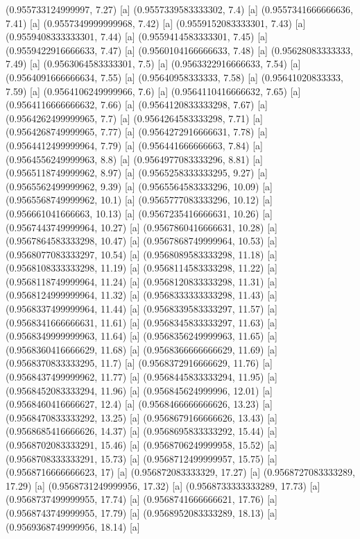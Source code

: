 {{{(0.955733124999997, 7.27) [a] 
(0.9557339583333302, 7.4) [a] 
(0.9557341666666636, 7.41) [a] 
(0.9557349999999968, 7.42) [a] 
(0.9559152083333301, 7.43) [a] 
(0.9559408333333301, 7.44) [a] 
(0.9559414583333301, 7.45) [a] 
(0.9559422916666633, 7.47) [a] 
(0.9560104166666633, 7.48) [a] 
(0.95628083333333, 7.49) [a] 
(0.9563064583333301, 7.5) [a] 
(0.9563322916666633, 7.54) [a] 
(0.9564091666666634, 7.55) [a] 
(0.95640958333333, 7.58) [a] 
(0.95641020833333, 7.59) [a] 
(0.9564106249999966, 7.6) [a] 
(0.9564110416666632, 7.65) [a] 
(0.9564116666666632, 7.66) [a] 
(0.9564120833333298, 7.67) [a] 
(0.9564262499999965, 7.7) [a] 
(0.9564264583333298, 7.71) [a] 
(0.9564268749999965, 7.77) [a] 
(0.9564272916666631, 7.78) [a] 
(0.9564412499999964, 7.79) [a] 
(0.956441666666663, 7.84) [a] 
(0.9564556249999963, 8.8) [a] 
(0.9564977083333296, 8.81) [a] 
(0.9565118749999962, 8.97) [a] 
(0.9565258333333295, 9.27) [a] 
(0.9565562499999962, 9.39) [a] 
(0.9565564583333296, 10.09) [a] 
(0.9565568749999962, 10.1) [a] 
(0.9565777083333296, 10.12) [a] 
(0.956661041666663, 10.13) [a] 
(0.9567235416666631, 10.26) [a] 
(0.9567443749999964, 10.27) [a] 
(0.9567860416666631, 10.28) [a] 
(0.9567864583333298, 10.47) [a] 
(0.9567868749999964, 10.53) [a] 
(0.9568077083333297, 10.54) [a] 
(0.9568089583333298, 11.18) [a] 
(0.9568108333333298, 11.19) [a] 
(0.9568114583333298, 11.22) [a] 
(0.9568118749999964, 11.24) [a] 
(0.9568120833333298, 11.31) [a] 
(0.9568124999999964, 11.32) [a] 
(0.9568333333333298, 11.43) [a] 
(0.9568337499999964, 11.44) [a] 
(0.9568339583333297, 11.57) [a] 
(0.9568341666666631, 11.61) [a] 
(0.9568345833333297, 11.63) [a] 
(0.9568349999999963, 11.64) [a] 
(0.9568356249999963, 11.65) [a] 
(0.9568360416666629, 11.68) [a] 
(0.9568366666666629, 11.69) [a] 
(0.9568370833333295, 11.7) [a] 
(0.9568372916666629, 11.76) [a] 
(0.9568437499999962, 11.77) [a] 
(0.9568445833333294, 11.95) [a] 
(0.9568452083333294, 11.96) [a] 
(0.956845624999996, 12.01) [a] 
(0.9568460416666627, 12.4) [a] 
(0.9568466666666626, 13.23) [a] 
(0.9568470833333292, 13.25) [a] 
(0.9568679166666626, 13.43) [a] 
(0.9568685416666626, 14.37) [a] 
(0.9568695833333292, 15.44) [a] 
(0.9568702083333291, 15.46) [a] 
(0.9568706249999958, 15.52) [a] 
(0.9568708333333291, 15.73) [a] 
(0.9568712499999957, 15.75) [a] 
(0.9568716666666623, 17) [a] 
(0.956872083333329, 17.27) [a] 
(0.9568727083333289, 17.29) [a] 
(0.9568731249999956, 17.32) [a] 
(0.9568733333333289, 17.73) [a] 
(0.9568737499999955, 17.74) [a] 
(0.9568741666666621, 17.76) [a] 
(0.9568743749999955, 17.79) [a] 
(0.9568952083333289, 18.13) [a] 
(0.9569368749999956, 18.14) [a] 
}}}
